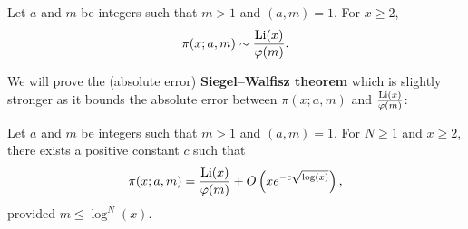     \begin{theorem}
      Let $a$ and $m$ be integers such that $m > 1$ and $(a,m) = 1$. For $x \ge 2$,
      \[
        \pi(x;a,m) \sim \frac{\operatorname{\mathrm{Li}}(x)}{\varphi(m)}.
      \]
    \end{theorem}
    
    We will prove the (absolute error) \textbf{Siegel–Walfisz theorem} which is slightly stronger as it bounds the absolute error between $\pi(x;a,m)$ and $\frac{\operatorname{\mathrm{Li}}(x)}{\varphi(m)}$:

    \begin{theorem}
      Let $a$ and $m$ be integers such that $m > 1$ and $(a,m) = 1$. For $N \ge 1$ and $x \ge 2$, there exists a positive constant $c$ such that
      \[
        \pi(x;a,m) = \frac{\operatorname{\mathrm{Li}}(x)}{\varphi(m)}+O\left(xe^{-c\sqrt{\log(x)}}\right),
      \]
      provided $m \le \log^{N}(x)$.
    \end{theorem}
